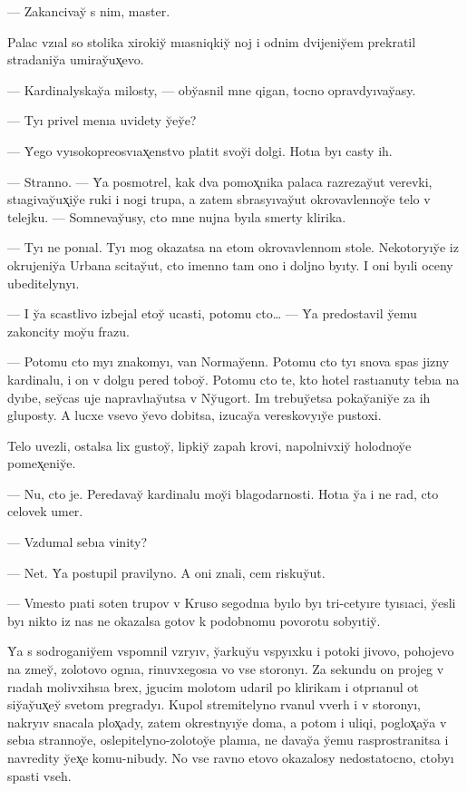 \documentclass[10pt]{book}
\begin{document}
— Zakancivay̆ s nim, master.

Palac vzıal so stolika xirokiy̆ mıasniqkiy̆ noj i odnim dvijeniy̆em prekratil stradaniy̆a umiray̆ux̨evo.

— Kardinalyskay̆a milosty, — oby̆asnil mne qigan, tocno opravdyıvay̆asy.

— Tyı privel menıa uvidety y̆ey̆e?

— Y̆ego vyısokopreosvıax̨enstvo platit svoy̆i dolgi. Hotıa byı casty ih.

— Stranno. — Y̆a posmotrel, kak dva pomox̨nika palaca razrezay̆ut verevki, stıagivay̆ux̨iy̆e ruki i nogi trupa, a zatem sbrasyıvay̆ut okrovavlennoy̆e telo v telejku. — Somnevay̆usy, cto mne nujna byıla smerty klirika.

— Tyı ne ponıal. Tyı mog okazatsa na etom okrovavlennom stole. Nekotoryıy̆e iz okrujeniy̆a Urbana scitay̆ut, cto imenno tam ono i doljno byıty. I oni byıli oceny ubeditelynyı.

— I y̆a scastlivo izbejal etoy̆ ucasti, potomu cto… — Y̆a predostavil y̆emu zakoncity moy̆u frazu.

— Potomu cto myı znakomyı, van Normay̆enn. Potomu cto tyı snova spas jizny kardinalu, i on v dolgu pered toboy̆. Potomu cto te, kto hotel rastıanuty tebıa na dyıbe, sey̆cas uje napravlıay̆utsa v Ny̆ugort. Im trebuy̆etsa pokay̆aniy̆e za ih gluposty. A lucxe vsevo y̆evo dobitsa, izucay̆a vereskovyıy̆e pustoxi.

Telo uvezli, ostalsa lix gustoy̆, lipkiy̆ zapah krovi, napolnivxiy̆ holodnoy̆e pomex̨eniy̆e.

— Nu, cto je. Peredavay̆ kardinalu moy̆i blagodarnosti. Hotıa y̆a i ne rad, cto celovek umer.

— Vzdumal sebıa vinity?

— Net. Y̆a postupil pravilyno. A oni znali, cem riskuy̆ut.

— Vmesto pıati soten trupov v Kruso segodnıa byılo byı tri-cetyıre tyısıaci, y̆esli byı nikto iz nas ne okazalsa gotov k podobnomu povorotu sobyıtiy̆.

Y̆a s sodroganiy̆em vspomnil vzryıv, y̆arkuy̆u vspyıxku i potoki jivovo, pohojevo na zmey̆, zolotovo ognıa, rinuvxegosıa vo vse storonyı. Za sekundu on projeg v rıadah molivxihsıa brex, jgucim molotom udaril po klirikam i otprıanul ot siy̆ay̆ux̨ey̆ svetom pregradyı. Kupol stremitelyno rvanul vverh i v storonyı, nakryıv snacala plox̨ady, zatem okrestnyıy̆e doma, a potom i uliqi, poglox̨ay̆a v sebıa strannoy̆e, oslepitelyno-zolotoy̆e plamıa, ne davay̆a y̆emu rasprostranitsa i navredity y̆ex̨e komu-nibudy. No vse ravno etovo okazalosy nedostatocno, ctobyı spasti vseh.
\end{document}
